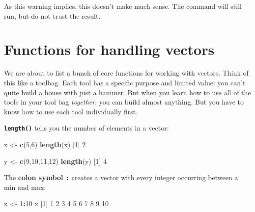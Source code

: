 \documentclass[]{book}
\newenvironment{Shaded}{\begin{snugshade}}{\end{snugshade}}
\newcommand{\DecValTok}[1]{\textcolor[rgb]{0.00,0.00,0.81}{#1}}
\newcommand{\KeywordTok}[1]{\textcolor[rgb]{0.13,0.29,0.53}{\textbf{#1}}}
\newcommand{\NormalTok}[1]{#1}
\newcommand{\OperatorTok}[1]{\textcolor[rgb]{0.81,0.36,0.00}{\textbf{#1}}}
\newcommand{\StringTok}[1]{\textcolor[rgb]{0.31,0.60,0.02}{#1}}
\begin{document}
As this warning implies, this doesn't make much sense. The command will still run, but do not trust the result.

\hypertarget{functions-for-handling-vectors}{%
\section*{Functions for handling vectors}\label{functions-for-handling-vectors}}

We are about to list a bunch of core functions for working with vectors. Think of this like a toolbag. Each tool has a specific purpose and limited value: you can't quite build a house with just a hammer. But when you learn how to use all of the tools in your tool bag \emph{together}, you can build almost anything. But you have to know how to use each tool individually first.

\textbf{\texttt{length()}} tells you the number of elements in a vector:

\begin{Shaded}
\begin{Highlighting}[]
\NormalTok{x <-}\StringTok{ }\KeywordTok{c}\NormalTok{(}\DecValTok{5}\NormalTok{,}\DecValTok{6}\NormalTok{)}
\KeywordTok{length}\NormalTok{(x)}
\NormalTok{[}\DecValTok{1}\NormalTok{] }\DecValTok{2}
\end{Highlighting}
\end{Shaded}

\begin{Shaded}
\begin{Highlighting}[]
\NormalTok{y <-}\StringTok{ }\KeywordTok{c}\NormalTok{(}\DecValTok{9}\NormalTok{,}\DecValTok{10}\NormalTok{,}\DecValTok{11}\NormalTok{,}\DecValTok{12}\NormalTok{)}
\KeywordTok{length}\NormalTok{(y)}
\NormalTok{[}\DecValTok{1}\NormalTok{] }\DecValTok{4}
\end{Highlighting}
\end{Shaded}

The \textbf{colon symbol \texttt{:}} creates a vector with every integer occurring between a min and max:

\begin{Shaded}
\begin{Highlighting}[]
\NormalTok{x <-}\StringTok{ }\DecValTok{1}\OperatorTok{:}\DecValTok{10}
\NormalTok{x}
\NormalTok{ [}\DecValTok{1}\NormalTok{]  }\DecValTok{1}  \DecValTok{2}  \DecValTok{3}  \DecValTok{4}  \DecValTok{5}  \DecValTok{6}  \DecValTok{7}  \DecValTok{8}  \DecValTok{9} \DecValTok{10}
\end{Highlighting}
\end{Shaded}
\end{document}
